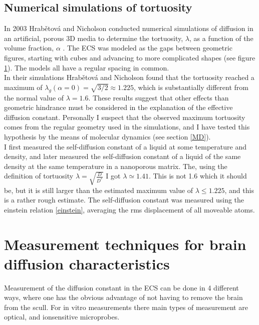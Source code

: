 \documentclass[a4paper,english, 12pt, twoside]{article}
\begin{document}
\subsection{Numerical simulations of tortuosity}
In 2003 Hrab\v{e}tov\'{a} and Nicholson conducted numerical simulations of diffusion in an artificial, porous 3D media to determine the tortuosity, $\lambda$, as a function of the volume fraction, $\alpha$ \cite{hrabetova2004contribution}. 
The ECS was modeled as the gaps between geometric figures, starting with cubes and advancing to more complicated shapes (see figure \ref{geometries}). 
The models all have a regular spacing in common. \\
In their simulations Hrab\v{e}tov\'{a} and Nicholson found that the tortuosity reached a maximum of $\lambda_g(\alpha=0) = \sqrt{3/2}\approx 1.225$, which is substantially different from the normal value of $\lambda = 1.6$. 
These results suggest that other effects than geometric hindrance must be considered in the explanation of the effective diffusion constant. 
Personally I suspect that the observed maximum tortuosity comes from the regular geometry used in the simulations, and I have tested this hypothesis by the means of molecular dynamics (see section \ref{MD}). \\
I first measured the self-diffusion constant of a liquid at some temperature and density, and later measured the self-diffusion constant of a liquid of the same density at the same temperature in a nanoporous matrix. 
The, using the definition of tortuosity $\lambda = \sqrt{\frac{D}{D^*}}$ I got $\lambda \simeq 1.41$. 
This is not 1.6 which it should be, but it is still larger than the estimated maximum value of $\lambda \leq 1.225$, and this is a rather rough estimate. 
The self-diffusion constant was measured using the einstein relation \ref{einstein}, averaging the rms displacement of all moveable atoms.
\begin{figure}[H]
 \centering
 \caption{}
 \label{geometries}
\end{figure}


\section{Measurement techniques for brain diffusion characteristics}
Measurement of the diffusion constant in the ECS can be done in 4 different ways, where one has the obvious advantage of not having to remove the brain from the scull. 
For in vitro measurements there main types of measurement are optical, and ionsensitive microprobes. 
\end{document}
